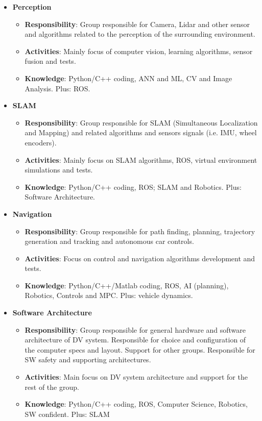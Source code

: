 \documentclass[graybox]{svmult}
\begin{document}
\begin{itemize}
	\item \textbf{Perception}
	\begin{itemize}
		\item \textbf{Responsibility}: Group responsible for Camera, Lidar and other sensor and algorithms related to the perception of the surrounding environment.
		\item \textbf{Activities}: Mainly focus of computer vision, learning algorithms, sensor fusion and tests.
		\item \textbf{Knowledge}: Python/C++ coding, ANN and ML, CV and Image Analysis. Plus: ROS.
	\end{itemize}
    
	\item \textbf{SLAM}
	\begin{itemize}
		\item \textbf{Responsibility}: Group responsible for SLAM (Simultaneous Localization and Mapping) and related algorithms and sensors signals (i.e. IMU, wheel encoders).
        \item \textbf{Activities}: Mainly focus on SLAM algorithms, ROS, virtual environment simulations and tests.
		\item \textbf{Knowledge}: Python/C++ coding, ROS; SLAM and Robotics. Plus: Software Architecture.
	\end{itemize}

	\item \textbf{Navigation}
	\begin{itemize}
		\item \textbf{Responsibility}: Group responsible for path finding, planning, trajectory generation and tracking and autonomous car controls.
		 \item \textbf{Activities}: Focus on control and navigation algorithms development and tests. 
		\item \textbf{Knowledge}: Python/C++/Matlab coding, ROS, AI (planning), Robotics, Controls and MPC. Plus: vehicle dynamics.
	\end{itemize}

	\item \textbf{Software Architecture}
    \begin{itemize}
		\item \textbf{Responsibility}: Group responsible for general hardware and software architecture of DV system. Responsible for choice and configuration of the computer specs and layout. Support for other groups. Responsible for SW safety and supporting architectures.
		\item \textbf{Activities}: Main focus on DV system architecture and support for the rest of the group.
		\item \textbf{Knowledge}: Python/C++ coding, ROS, Computer Science, Robotics, SW confident. Plus: SLAM
	\end{itemize}


\end{itemize}
\end{document}
